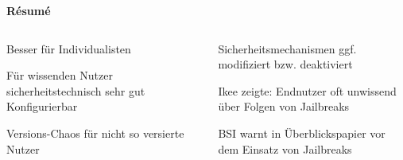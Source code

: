 \begin{frame}
	\centering
	\textbf{Résumé}
	\begin{columns}
		\begin{column}[T]{5cm} %
			\begin{block}{}
				Besser für Individualisten
			\end{block}{}
			\begin{block}{}
				Für wissenden Nutzer sicherheitstechnisch sehr gut Konfigurierbar
			\end{block}
			\begin{block}{}
				Versions-Chaos für nicht so versierte Nutzer
			\end{block}
		\end{column}

		\begin{column}[T]{5cm} %
				\begin{block}{}
					Sicherheitsmechanismen ggf. modifiziert bzw. deaktiviert
				\end{block}
				\begin{block}{}
					Ikee zeigte: Endnutzer oft unwissend über Folgen von Jailbreaks
				\end{block}
				\begin{block}{}
					BSI warnt in Überblickspapier vor dem Einsatz von Jailbreaks
				\end{block}
		\end{column}	
		\end{columns}
\end{frame}